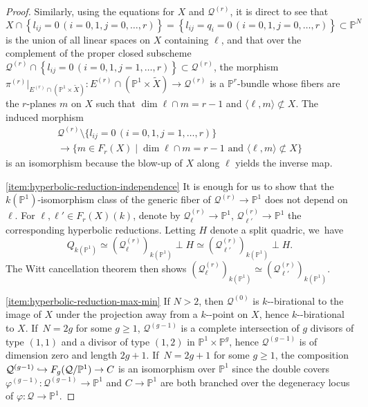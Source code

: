 \documentclass[10pt,a4paper]{amsart}
\providecommand{\nobreakdash}{\nobreak\hbox{-}}
\newcommand\hto{\mathrel{\lhook\joinrel\to}}
\theoremstyle{plain}
\theoremstyle{definition}
\let\phi\varphi
\renewcommand\P{\mathbb{P}}
\begin{document}
\begin{proof}
Similarly, using the equations for $X$ and $\mathcal{Q}^{(r)}$,
it is direct to see that
\[
X\cap \left\{l_{ij}=0\, (i=0,1, j=0,\dots, r)\right\}=\left\{l_{ij}=q_i = 0 \, (i=0,1, j=0,\dots, r)\right\}\subset \P^N
\]
is the union of all linear spaces on $X$ containing $\ell$,
and that
over the complement of the proper closed subscheme $\mathcal{Q}^{(r)}\cap\left\{l_{ij} = 0 \, (i= 0,1, j=1,\dots, r)\right\}\subset \mathcal{Q}^{(r)}$, the morphism $\pi^{(r)}|_{E^{(r)}\cap (\P^1\times \widetilde{X})}\colon E^{(r)}\cap (\P^1\times \widetilde{X})\to \mathcal{Q}^{(r)}$ is
a $\P^{r}$-bundle whose fibers are the $r$-planes $m$ on $X$ such that $\dim \ell\cap m = r-1$ and $\langle \ell, m\rangle \not\subset X$.
The induced morphism
\begin{multline*}
\mathcal{Q}^{(r)}\setminus\bigl\{l_{ij} = 0 \, (i= 0,1, j=1,\dots, r)\bigr\}\\
\to\bigl\{m\in F_r(X)\mid \dim \ell\cap m = r-1 \text{ and }\langle \ell,m\rangle \not\subset X\bigr\}
\end{multline*}
is an isomorphism because the blow-up of $X$ along $\ell$ yields the inverse map.

\eqref{item:hyperbolic-reduction-independence}
It is enough for us to show that the $k(\P^1)$-isomorphism class of the generic fiber of $\mathcal{Q}^{(r)}\to \P^1$ does not depend on $\ell$.
For $\ell, \ell'\in F_r(X)(k)$, denote by $\mathcal{Q}^{(r)}_\ell\to \P^1$, $\mathcal{Q}^{(r)}_{\ell'}\to \P^1$
the corresponding hyperbolic reductions. Letting $H$ denote a split quadric, we~have
\[
Q_{k(\P^1)}\simeq (\mathcal{Q}^{(r)}_{\ell})_{k(\P^1)}\perp H \simeq (\mathcal{Q}^{(r)}_{\ell'})_{k(\P^1)}\perp H.
\]
The Witt cancellation theorem \cite[Th.\,8.4]{EKM-quadratic-forms}
then shows $(\mathcal{Q}^{(r)}_\ell)_{k(\P^1)}\simeq (\mathcal{Q}^{(r)}_{\ell'})_{k(\P^1)}$.

\eqref{item:hyperbolic-reduction-max-min}
If $N>2$, then $\mathcal{Q}^{(0)}$ is $k$\nobreakdash-birational to the image of $X$ under the projection away from a $k$\nobreakdash-point on $X$, hence $k$\nobreakdash-birational to $X$. If~$N=2g$ for some $g\geq 1$, $\mathcal{Q}^{(g-1)}$ is a complete intersection of $g$ divisors of type $(1,1)$ and a divisor of type $(1,2)$ in $\P^1\times \P^{g}$, hence $\mathcal{Q}^{(g-1)}$ is of dimension zero and length $2g+1$. If~$N=2g+1$ for some $g\geq 1$,
the composition $\mathcal{Q}^{(g-1)}\hto F_{g}(\mathcal{Q}/\P^1)\to C$ is an isomorphism over \(\P^1\)
since the double covers $\phi^{(g-1)}\colon\mathcal{Q}^{(g-1)}\to \P^1$ and $C\to \P^1$ are both branched over the degeneracy locus of $\phi\colon \mathcal{Q}\to \P^1$.


\end{proof}
\end{document}
